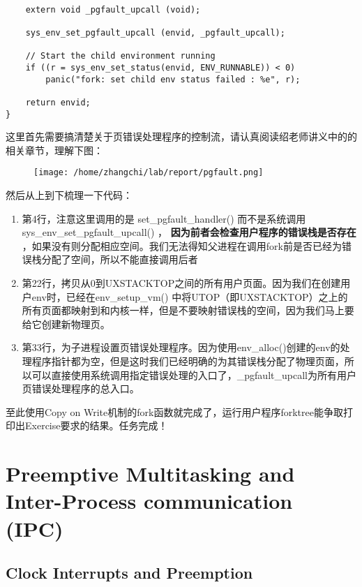 \documentclass{article}
\newcommand{\highlight}[1]{{\bfseries \color{red}  #1}}
\newcommand{\funcname}[1]{{\ttfamily \small #1}}
\begin{document}
\begin{CJK*}{UTF8}{gkai}
\begin{lstlisting}[style=ccode, title={\scriptsize \ttfamily \bfseries lib/fork.c: fork()}]
    
    extern void _pgfault_upcall (void);

    sys_env_set_pgfault_upcall (envid, _pgfault_upcall);

    // Start the child environment running
    if ((r = sys_env_set_status(envid, ENV_RUNNABLE)) < 0)
        panic("fork: set child env status failed : %e", r);

    return envid;
}
\end{lstlisting}

这里首先需要搞清楚关于页错误处理程序的控制流，请认真阅读绍老师讲义中的的相关章节，理解下图：
\newpage


\begin{figure}[htp]
\centering
\texttt{[image: /home/zhangchi/lab/report/pgfault.png]}
\end{figure}


然后从上到下梳理一下代码：

\begin{enumerate}
\item{第4行，注意这里调用的是 \funcname{ set\_pgfault\_handler() } 而不是系统调用 \funcname{ sys\_env\_set\_pgfault\_upcall() }，\highlight{ 因为前者会检查用户程序的错误栈是否存在 }，如果没有则分配相应空间。我们无法得知父进程在调用fork前是否已经为错误栈分配了空间，所以不能直接调用后者}
\item{第22行，拷贝从0到UXSTACKTOP之间的所有用户页面。因为我们在创建用户env时，已经在\funcname{env\_setup\_vm()} 中将UTOP（即UXSTACKTOP）之上的所有页面都映射到和内核一样，但是不要映射错误栈的空间，因为我们马上要给它创建新物理页。}
\item{第33行，为子进程设置页错误处理程序。因为使用\funcname{env\_alloc()}创建的env的处理程序指针都为空，但是这时我们已经明确的为其错误栈分配了物理页面，所以可以直接使用系统调用指定错误处理的入口了，\_pgfault\_upcall为所有用户页错误处理程序的总入口。}

\end{enumerate}

至此使用Copy on Write机制的fork函数就完成了，运行用户程序forktree能争取打印出Exercise要求的结果。任务完成！





\section{Preemptive Multitasking and Inter-Process communication (IPC)}

\subsection{Clock Interrupts and Preemption}


\end{CJK*}
\end{document}
